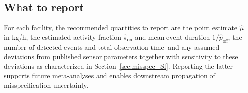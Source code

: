\documentclass[11pt]{article}
\newcommand{\new}[1]{#1}
\begin{document}
\subsection{What to report}
\new{For each facility, the recommended quantities to report are the point estimate $\hat\mu$ in kg/h, the estimated activity fraction $\hat\pi_{\text{on}}$ and mean event duration $1/\hat p_{\text{off}}$, the number of detected events and total observation time, and any assumed deviations from published sensor parameters together with sensitivity to these deviations as characterized in Section~\ref{sec:misspec_SI}. Reporting the latter supports future meta-analyses and enables downstream propagation of misspecification uncertainty.}




\end{document}
